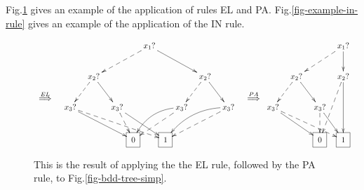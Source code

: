 Fig.\ref{fig-el-pa-example} 
gives an example
of the application of rules EL and PA.
Fig.\ref{fig-example-in-rule}
gives an example of the 
application of the IN rule.


\begin{figure}[h!]
$$
\xymatrix{
\\\\
\stackrel{EL}{\implies}}
\xymatrix@C=.1pc{
&&&&&&&x_1?\ar@{-->}[dllll]
\ar[drrrr]
\\
&&&x_2?\ar@{-->}[dll]\ar[drr]
&&&&&&&&x_2?\ar@{-->}[dll]\ar[drr]
\\
&x_3?\ar@{-->}[drrrrrrr]\ar[drrrrr]
&&&&x_3?\ar@{-->}[dr]\ar[drrr]
&&&&x_3?\ar@{-->}[dlll]\ar@/_1pc/[dlll]
&&&&x_3?\ar@{-->}[dlllll]\ar@/_1pc/[dlllll]
\\
&&
&&
&&\Rect{0}
&&\Rect{1}
&&
&&
&&
}
\xymatrix{
\\\\\stackrel{PA}{\implies}}
\xymatrix@C=.1pc{
&&&&&&x_1?\ar@{-->}[dllll]
\ar[d]
\\
&&x_2?\ar@{-->}[dll]\ar[drr]
&&&&x_2?\ar@{-->}[ddll]\ar[dd]
\\
x_3?\ar@{-->}[drrrrrr]\ar[drrrr]
&&&&x_3?\ar@{-->}[d]\ar[drr]
\\
&&
&&\Rect{0}
&&\Rect{1}
&&
&&
&&
}
$$
\caption{This is the 
result of applying the
the EL rule, followed by the PA
rule, to Fig.\ref{fig-bdd-tree-simp}.}
\label{fig-el-pa-example}
\end{figure}

